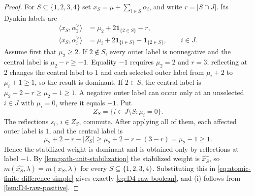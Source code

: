 \documentclass[11pt]{article}
\theoremstyle{definition}
\theoremstyle{remark}
\begin{document}
\begin{proof}
For $S\subseteq\{1,2,3,4\}$ set
$x_S=\mu+\sum_{i\in S}\alpha_i$, and write $r=|S\cap J|$.  Its Dynkin labels
are
\begin{align*}
 \langle x_S,\alpha_2^\vee\rangle
   &=\mu_2+2\mathbf 1_{\{2\in S\}}-r,\\
 \langle x_S,\alpha_i^\vee\rangle
   &=\mu_i+2\mathbf 1_{\{i\in S\}}-
      \mathbf 1_{\{2\in S\}},\qquad i\in J.
\end{align*}
Assume first that $\mu_2\ge2$.  If $2\notin S$, every outer label is
nonnegative and the central label is $\mu_2-r\ge-1$.  Equality $-1$ requires
$\mu_2=2$ and $r=3$; reflecting at $2$ changes the central label to $1$ and
each selected outer label from $\mu_i+2$ to $\mu_i+1\ge1$, so the result is
dominant.  If $2\in S$, the central label is
$\mu_2+2-r\ge\mu_2-1\ge1$.  A negative outer label can occur only at an
unselected $i\in J$ with $\mu_i=0$, where it equals $-1$.  Put
\[
 Z_S=\{i\in J\setminus S:\mu_i=0\}.
\]
The reflections $s_i$, $i\in Z_S$, commute.  After applying all of them, each
affected outer label is $1$, and the central label is
\[
 \mu_2+2-r-|Z_S|
   \ge \mu_2+2-r-(3-r)=\mu_2-1\ge1.
\]
Hence the stabilized weight is dominant and is obtained only by reflections
at label $-1$.  By \cref{lem:path-unit-stabilization} the stabilized weight is
$\widehat{x_S}$, so $m(\widehat{x_S},\lambda)=m(x_S,\lambda)$ for every
$S\subseteq\{1,2,3,4\}$.  Substituting this in
\eqref{eq:atomic-finite-difference-simple} gives exactly
\eqref{eq:D4-raw-boolean}, and (i) follows from
\cref{lem:D4-raw-positive}.


\end{proof}
\end{document}
